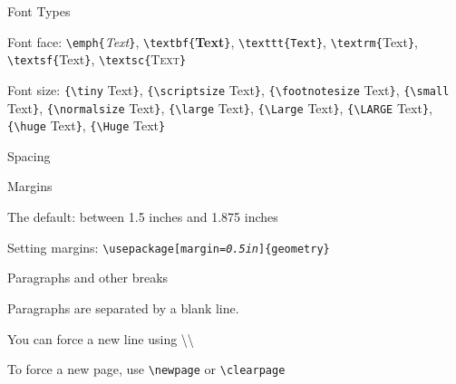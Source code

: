 
\begin{frame}{Font Types}
\begin{block}{Font face:}
\texttt{\textbackslash emph\{}\emph{Text}\texttt{\}}, \texttt{\textbackslash textbf\{}\textbf{Text}\texttt{\}}, \texttt{\textbackslash texttt\{}\texttt{Text}\texttt{\}}, \texttt{\textbackslash textrm\{}\textrm{Text}\texttt{\}}, \texttt{\textbackslash textsf\{}\textsf{Text}\texttt{\}}, \texttt{\textbackslash textsc\{}\textsc{Text}\texttt{\}}
\end{block}
\begin{block}{Font size:}
\texttt{\{\textbackslash tiny} {\tiny Text}\texttt{\}}, \texttt{\{\textbackslash scriptsize} {\scriptsize Text}\texttt{\}}, \texttt{\{\textbackslash footnotesize} {\footnotesize Text}\texttt{\}}, \texttt{\{\textbackslash small} {\small Text}\texttt{\}}, \texttt{\{\textbackslash normalsize} {\normalsize Text}\texttt{\}}, \texttt{\{\textbackslash large} {\large Text}\texttt{\}}, \texttt{\{\textbackslash Large} {\Large Text}\texttt{\}}, \texttt{\{\textbackslash LARGE} {\LARGE Text}\texttt{\}}, \texttt{\{\textbackslash huge} {\huge Text}\texttt{\}}, \texttt{\{\textbackslash Huge} {\Huge Text}\texttt{\}}
\end{block}
\end{frame}


\begin{frame}{Spacing}
\begin{block}{Margins}
{\small The default: between 1.5 inches and 1.875 inches

Setting margins: \texttt{\textbackslash usepackage[margin=\emph{0.5in}]\{geometry\}}}
\end{block}
\begin{block}{Paragraphs and other breaks}
{\small Paragraphs are separated by a blank line.

You can force a new line using \textbackslash\textbackslash

To force a new page, use \texttt{\textbackslash newpage} or \texttt{\textbackslash clearpage}}
\end{block}
%
%
\end{frame}

